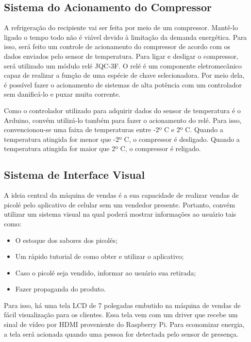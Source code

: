 \subsection{Sistema do Acionamento do Compressor}

A refrigeração do recipiente vai ser feita por meio de um compressor. Mantê-lo ligado o tempo todo não é viável devido à limitação da demanda energética. Para isso, será feito um controle de acionamento do compressor de acordo com os dados enviados pelo sensor de temperatura. Para ligar e desligar o compressor, será utilizado um módulo relé JQC-3F. O relé é um componente eletromecânico capaz de realizar a função de uma espécie de chave selecionadora. Por meio dela, é possível fazer o acionamento de sistemas de alta potência com um controlador sem danificá-lo e puxar muita corrente.

Como o controlador utilizado para adquirir dados do sensor de temperatura é o Arduino, convém utilizá-lo também para fazer o acionamento do relé. Para isso, convencionou-se uma faixa de temperaturas entre -2º C e 2º C. Quando a temperatura atingida for menor que -2º C, o compressor é desligado. Quando a temperatura atingida for maior que 2º C, o compressor é religado.

\subsection{Sistema de Interface Visual}

A ideia central da máquina de vendas é a sua capacidade de realizar vendas de picolé pelo aplicativo de celular sem um vendedor presente. Portanto, convém utilizar um sistema visual na qual poderá mostrar informações ao usuário tais como:

\begin{itemize}
  \item O estoque dos sabores dos picolés;
  \item Um rápido tutorial de como obter e utilizar o aplicativo;
  \item Caso o picolé seja vendido, informar ao usuário sua retirada;
  \item Fazer propaganda do produto.
\end{itemize}

Para isso, há uma tela LCD de 7 polegadas embutido na máquina de vendas de fácil visualização para os clientes. Essa tela vem com um driver que recebe um sinal de vídeo por HDMI proveniente do Raspberry Pi. Para economizar energia, a tela será acionada quando uma pessoa for detectada pelo sensor de presença.

